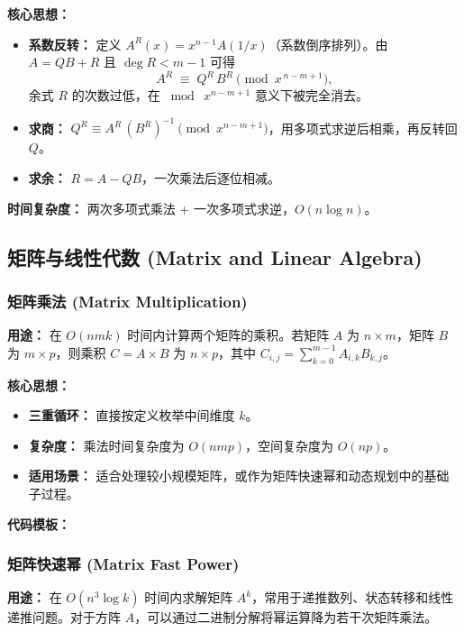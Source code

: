 \textbf{核心思想：}
\begin{itemize}
    \item \textbf{系数反转：} 定义 $A^{R}(x)=x^{n-1}A(1/x)$（系数倒序排列）。由 $A=QB+R$ 且 $\deg R < m-1$ 可得
    \[ A^{R} \;\equiv\; Q^{R}\,B^{R} \pmod{x^{\,n-m+1}}, \]
    余式 $R$ 的次数过低，在 $\bmod\ x^{n-m+1}$ 意义下被完全消去。
    \item \textbf{求商：} $Q^{R} \equiv A^{R}\,(B^{R})^{-1} \pmod{x^{n-m+1}}$，用多项式求逆后相乘，再反转回 $Q$。
    \item \textbf{求余：} $R = A - Q B$，一次乘法后逐位相减。
\end{itemize}

\textbf{时间复杂度：} 两次多项式乘法 + 一次多项式求逆，$O(n\log n)$。



\subsection{矩阵与线性代数 (Matrix and Linear Algebra)}

\subsubsection{矩阵乘法 (Matrix Multiplication)}

\textbf{用途：}
在 $O(nmk)$ 时间内计算两个矩阵的乘积。若矩阵 $A$ 为 $n \times m$，矩阵 $B$ 为 $m \times p$，则乘积 $C = A \times B$ 为 $n \times p$，其中
$C_{i,j} = \sum_{k=0}^{m-1} A_{i,k} B_{k,j}$。

\textbf{核心思想：}
\begin{itemize}
    \item \textbf{三重循环：} 直接按定义枚举中间维度 $k$。
    \item \textbf{复杂度：} 乘法时间复杂度为 $O(nmp)$，空间复杂度为 $O(np)$。
    \item \textbf{适用场景：} 适合处理较小规模矩阵，或作为矩阵快速幂和动态规划中的基础子过程。
\end{itemize}

\textbf{代码模板：}



\subsubsection{矩阵快速幂 (Matrix Fast Power)}

\textbf{用途：}
在 $O(n^3 \log k)$ 时间内求解矩阵 $A^k$，常用于递推数列、状态转移和线性递推问题。对于方阵 $A$，可以通过二进制分解将幂运算降为若干次矩阵乘法。

